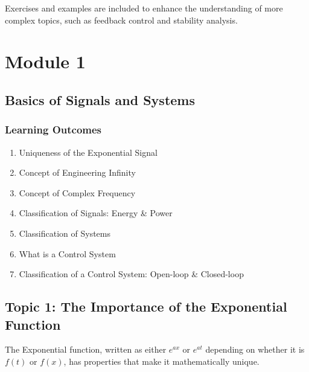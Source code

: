 \documentclass[
  12pt,
  a4paper,
]{report}
\begin{document}
Exercises and examples are included to enhance the understanding of more
complex topics, such as feedback control and stability analysis.

\part{Module 1}

\chapter{Basics of Signals and
Systems}\label{basics-of-signals-and-systems}

\label{learningoutcomesmodule1}
\section*{Learning Outcomes}\label{learning-outcomes}


\begin{enumerate}[label=\(\blacktriangleright\), leftmargin=*, itemsep=0.5em]
    \item Uniqueness of the Exponential Signal
    \item Concept of Engineering Infinity
    \item Concept of Complex Frequency
    \item Classification of Signals: Energy \& Power
    \item Classification of Systems
    \item What is a Control System
    \item Classification of a Control System: Open-loop \& Closed-loop
\end{enumerate}

\chapter{Topic 1: The Importance of the Exponential
Function}\label{topic-1-the-importance-of-the-exponential-function}

\label{topic1}
The Exponential function, written as either \(e^{ax}\) or \(e^{at}\)
depending on whether it is \(f(t)\) or \(f(x)\), has properties that
make it mathematically unique.
\end{document}
